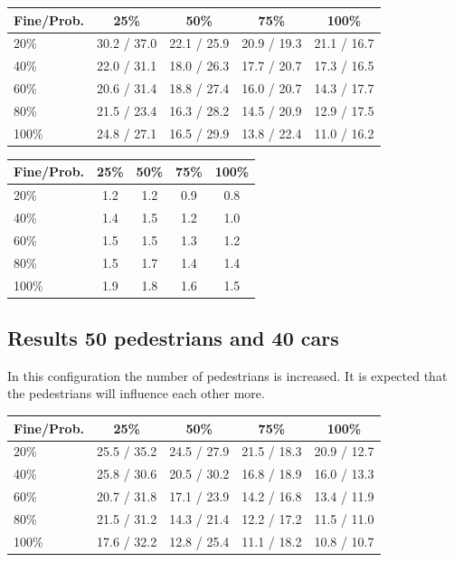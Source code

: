 \documentclass[a4paper]{article}
\begin{document}
\begin{table}[H]
\centering
\begin{tabular}{ l | c c c c }
  Fine\slash Prob. & 25\% & 50\% & 75\% & 100\% \\ 
  \hline
  20\%  & 30.2 / 37.0 & 22.1 / 25.9 & 20.9 / 19.3 & 21.1 / 16.7  \\
  40\%  & 22.0 / 31.1 & 18.0 / 26.3 & 17.7 / 20.7 & 17.3 / 16.5  \\
  60\%  & 20.6 / 31.4 & 18.8 / 27.4 & 16.0 / 20.7 & 14.3 / 17.7  \\
  80\%  & 21.5 / 23.4 & 16.3 / 28.2 & 14.5 / 20.9 & 12.9 / 17.5  \\
  100\% & 24.8 / 27.1 & 16.5 / 29.9 & 13.8 / 22.4 & 11.0 / 16.2  \\
\end{tabular}
\end{table}

\begin{table}[H]
\centering
\begin{tabular}{ l | c c c c }
  Fine\slash Prob. & 25\% & 50\% & 75\% & 100\% \\ 
  \hline
  20\%  & 1.2 & 1.2 & 0.9 & 0.8  \\
  40\%  & 1.4 & 1.5 & 1.2 & 1.0  \\
  60\%  & 1.5 & 1.5 & 1.3 & 1.2  \\
  80\%  & 1.5 & 1.7 & 1.4 & 1.4  \\
  100\% & 1.9 & 1.8 & 1.6 & 1.5  \\
\end{tabular}
\end{table}

\subsection{Results 50 pedestrians and 40 cars}
In this configuration the number of pedestrians is increased. It is expected that the pedestrians will influence each other more.

\begin{table}[H]
\centering
\begin{tabular}{ l | c c c c }
  Fine\slash Prob. & 25\% & 50\% & 75\% & 100\% \\ 
  \hline
  20\%  & 25.5 / 35.2 & 24.5 / 27.9 & 21.5 / 18.3 & 20.9 / 12.7  \\
  40\%  & 25.8 / 30.6 & 20.5 / 30.2 & 16.8 / 18.9 & 16.0 / 13.3  \\
  60\%  & 20.7 / 31.8 & 17.1 / 23.9 & 14.2 / 16.8 & 13.4 / 11.9  \\
  80\%  & 21.5 / 31.2 & 14.3 / 21.4 & 12.2 / 17.2 & 11.5 / 11.0  \\
  100\% & 17.6 / 32.2 & 12.8 / 25.4 & 11.1 / 18.2 & 10.8 / 10.7  \\
\end{tabular}
\end{table}
\end{document}

